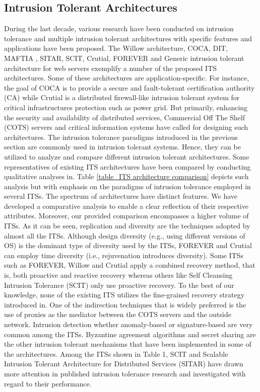 \documentclass[preprint,number,12pt]{elsarticle}
\begin{document}
\subsection{Intrusion Tolerant Architectures}
During the last decade, various research have been conducted on intrusion tolerance and multiple intrusion tolerant architectures with specific features and applications have been proposed. The Willow architecture\citep{Knight2003a}, COCA\citep{Zhou2002}, DIT\citep{Valdes2003}, MAFTIA\citep{Stroud2004a} , SITAR\citep{Wang2003a}, SCIT\citep{Bangalore2009a}, Crutial\citep{Bessani2008c}, FOREVER \citep{Sousa2008} and Generic intrusion tolerant architecture for web servers\citep{Saidane2009a} exemplify a number of the proposed ITS architectures. Some of these architectures are application-specific. For instance, the goal of COCA is to provide a secure and fault-tolerant certification authority (CA) while Crutial is a distributed firewall-like intrusion tolerant system for critical infrastructures protection such as power grid. But primarily, enhancing the security and availability of distributed services, Commercial Off The Shelf (COTS) servers and critical information systems have called for designing such architectures. The intrusion tolerance paradigms introduced in the previous section are commonly used in intrusion tolerant systems. Hence, they can be utilized to analyze and compare different intrusion tolerant architectures. Some representatives of existing ITS architectures have been compared by conducting qualitative analyses in\citep{Nguyen201124,Raj2011}. Table \ref{table_ITS architecture comparison} depicts such analysis but with emphasis on the paradigms of intrusion tolerance employed in several ITSs. The spectrum of architectures have distinct features. We have developed a comparative analysis to enable a clear reflection of their respective attributes. Moreover, our provided comparison encompasses a higher volume of ITSs.  As it can be seen, replication and diversity are the techniques adopted by almost all the ITSs. Although design diversity (e.g., using different versions of OS) is the dominant type of diversity used by the ITSs, FOREVER and Crutial can employ time diversity (i.e., rejuvenation introduces diversity). Some ITSs such as FOREVER, Willow and Crutial apply a combined recovery method, that is, both proactive and reactive recovery whereas others like Self Cleansing Intrusion Tolerance (SCIT) only use proactive recovery. To the best of our knowledge, none of the existing ITS utilizes the fine-grained recovery strategy introduced in\citep{springerlink:10.1007/978-3-642-23971-7_36}. One of the indirection techniques that is widely preferred is the use of proxies as the mediator between the COTS servers and the outside network. Intrusion detection whether anomaly-based or signature-based are very common among the ITSs. Byzantine agreement algorithms and secret sharing are the other intrusion tolerant mechanisms that have been implemented in some of the architectures. Among the ITSs shown in Table 1, SCIT and Scalable Intrusion Tolerant Architecture for Distributed Services (SITAR) have drawn more attention in published intrusion tolerance research and investigated with regard to their performance\citep{Garcia2011a,Obelheiro2006,Sousa2006,Sousa2008}.
\end{document}
